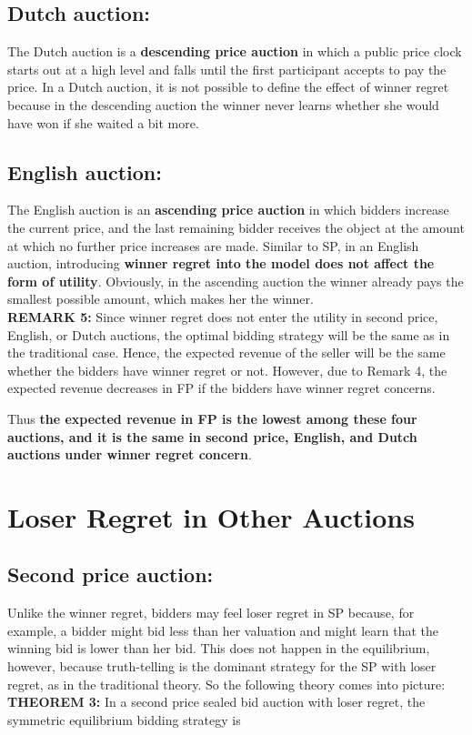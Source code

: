 \documentclass[10pt,a4paper,oneside]{report}
\begin{document}
\subsection{Dutch auction:}
The Dutch auction is a \textbf{descending price auction} in which a public price clock starts out at a high level and falls until the first participant accepts to pay the price. In a Dutch auction, it is not possible to define the effect of winner regret because in the descending auction the winner never learns whether she would have won if she waited a bit more.

\subsection{English auction:}
The English auction is an \textbf{ascending price auction} in which bidders increase the current price, and the last remaining bidder receives the object at the amount at which no further price increases are made. Similar to SP, in an English auction, introducing \textbf{winner regret into the model does not affect the form of utility}. Obviously, in the ascending auction the winner already pays the smallest possible amount, which makes her the winner.\\[3mm]

\noindent \textbf{REMARK 5:} Since winner regret does not enter the utility in second price, English, or Dutch auctions, the optimal bidding strategy will be the same as in the traditional case. Hence, the expected revenue of the seller will be the same whether the bidders have winner regret or not. However, due to Remark 4, the expected revenue decreases in FP if the bidders have winner regret concerns.\citep{filizy2005auctions}

\noindent Thus \textbf{the expected revenue in FP is the lowest among these four auctions, and it is the same in second price, English, and Dutch auctions under winner regret concern}.

\section{Loser Regret in Other Auctions}
	\subsection{Second price auction:}
Unlike the winner regret, bidders may feel loser regret in SP because, for example, a bidder might bid less than her valuation and might learn that the winning bid is lower than her bid. This does not happen in the equilibrium, however, because truth-telling is the dominant strategy for the SP with loser regret, as in the traditional theory. So the following theory comes into picture:\\[3mm]
\textbf{THEOREM 3:} In a second price sealed bid auction with loser regret, the symmetric equilibrium bidding strategy is \citep{filizy2005auctions} \\
\end{document}
